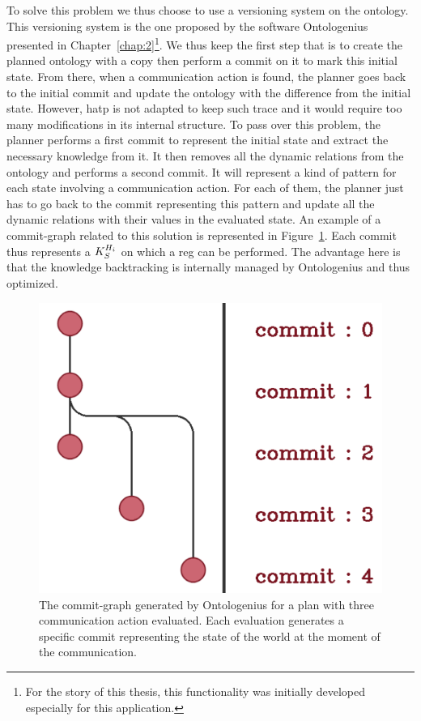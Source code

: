 To solve this problem we thus choose to use a versioning system on the ontology. This versioning system is the one proposed by the software Ontologenius presented in Chapter~\ref{chap:2}\footnote{For the story of this thesis, this functionality was initially developed especially for this application.}. We thus keep the first step that is to create the planned ontology with a copy then perform a commit on it to mark this initial state. From there, when a communication action is found, the planner goes back to the initial commit and update the ontology with the difference from the initial state. However, \acrshort{hatp} is not adapted to keep such trace and it would require too many modifications in its internal structure. To pass over this problem, the planner performs a first commit to represent the initial state and extract the necessary knowledge from it. It then removes all the dynamic relations from the ontology and performs a second commit. It will represent a kind of pattern for each state involving a communication action. For each of them, the planner just has to go back to the commit representing this pattern and update all the dynamic relations with their values in the evaluated state. An example of a commit-graph related to this solution is represented in Figure~\ref{fig:chap5_versioning_simple}. Each commit thus represents a $K_S^{H_i}$ on which a \acrshort{reg} can be performed. The advantage here is that the knowledge backtracking is internally managed by Ontologenius and thus optimized.

\begin{figure}[!ht]
\centering
\includegraphics[scale=0.3]{figures/chapter5/versioning_simple.png}
\caption{\label{fig:chap5_versioning_simple} The commit-graph generated by Ontologenius for a plan with three communication action evaluated. Each evaluation generates a specific commit representing the state of the world at the moment of the communication. }
\end{figure}

